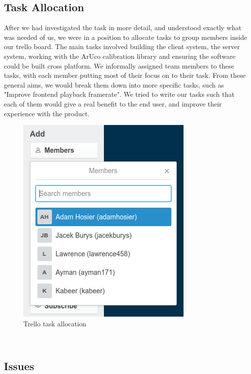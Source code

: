 \documentclass{article}
\begin{document}
\subsection{Task Allocation}
After we had investigated the task in more detail, and understood exactly what was needed of us, we were in a position to allocate tasks to group members inside our trello board. The main tasks involved building the client system, the server system, working with the ArUco calibration library and ensuring the software could be built cross platform. We informally assigned team members to these tasks, with each member putting most of their focus on to their task. From these general aims, we would break them down into more specific tasks, such as "Improve frontend playback framerate". We tried to write our tasks such that each of them would give a real benefit to the end user, and improve their experience with the product.
\begin{figure}[h]
  \centering
  \includegraphics[scale=0.5]{trello2}
  \caption{Trello task allocation}
  \label{fig:trello}
\end{figure}
\\ 

\newpage
\subsection{Issues}
\end{document}
